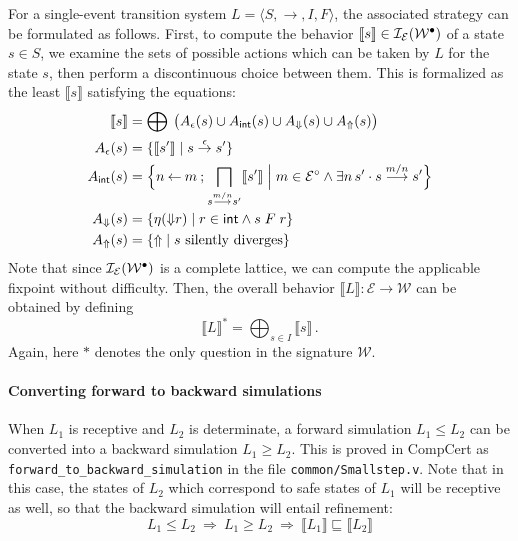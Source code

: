 \documentclass[sigplan,10pt,authordraft]{acmart}
\newcommand{\bdot}{\cdot}
\begin{document}
For a single-event transition system
$L = \langle S, {\rightarrow}, I, F \rangle$,
the associated strategy
can be formulated as follows.
First,
to compute the behavior
$\llbracket s \rrbracket \in \mathcal{I}_\mathcal{E}(\mathcal{W}^\bullet)$
of a state $s \in S$,
we examine the sets of possible actions
which can be taken by $L$
for the state $s$,
then perform a discontinuous choice between them.
This is formalized as the least $\llbracket s \rrbracket$
satisfying the equations:
\begin{align*}
  \llbracket s \rrbracket &=
    \bigoplus \:
    \big(
      A_\epsilon(s) \cup A_\kw{int}(s) \cup
      A_\Downarrow(s) \cup A_\Uparrow(s)
    \big)
  \\
  A_\epsilon(s) &=
    \{ \llbracket s' \rrbracket \mid s \stackrel{\epsilon}{\rightarrow} s' \}
  \\
  A_\kw{int}(s) &=
    \Big\{
      n \mathbin\leftarrow m \mathbin;
      \bigsqcap_{s \stackrel{m/n}{\longrightarrow} s'}
	\llbracket s' \rrbracket
    \mathrel{\Big\vert}
      m \in \mathcal{E}^\que \wedge
      \exists n \, s' \bdot s \stackrel{m/n}{\longrightarrow} s'
    \Big\}
  \\
  A_\Downarrow(s) &=
    \{ \eta({\Downarrow} r) \mid r \in \kw{int} \wedge s \mathrel{F} r \}
  \\
  A_\Uparrow(s) &=
    \{ {\Uparrow} \mid s \text{ silently diverges} \}
\end{align*}
Note that since $\mathcal{I}_\mathcal{E}(\mathcal{W}^\bullet)$
is a complete lattice,
we can compute the applicable fixpoint without difficulty.
Then,
the overall behavior
$\llbracket L \rrbracket : \mathcal{E} \rightarrow \mathcal{W}$
can be obtained by defining
\[
  \llbracket L \rrbracket^* = \bigoplus_{s \in I} \llbracket s \rrbracket
  \,.
\]
Again, here $*$ denotes the only question in the signature $\mathcal{W}$.

\paragraph{Converting forward to backward simulations}

When $L_1$ is receptive and $L_2$ is determinate,
a forward simulation $L_1 \le L_2$ can be converted
into a backward simulation $L_1 \ge L_2$.
This is proved in CompCert
as \texttt{forward\_to\_backward\_simulation}
in the file \texttt{common/Smallstep.v}.
Note that in this case,
the states of $L_2$ which correspond
to safe states of $L_1$ will be receptive as well,
so that the backward simulation will entail refinement:
\[
  L_1 \le L_2 \: \Rightarrow \:
  L_1 \ge L_2 \: \Rightarrow \:
  \llbracket L_1 \rrbracket \sqsubseteq \llbracket L_2 \rrbracket
\]
\end{document}
